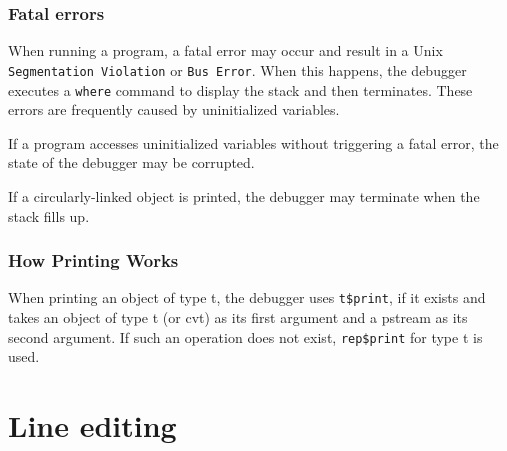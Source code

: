 \subsubsection{Fatal errors}

When running a program, a fatal error may occur and result in a Unix {\tt
Segmentation Violation} or {\tt Bus Error}.  When this happens, the debugger
executes a {\tt where} command to display the stack and then terminates.  These
errors are frequently caused by uninitialized variables.

If a program accesses uninitialized variables without triggering a fatal error,
the state of the debugger may be corrupted.

If a circularly-linked object is printed, the debugger may terminate
when the stack fills up.

\subsubsection{How Printing Works}

When printing an object of type t, the debugger uses {\tt t\$print}, if it
exists and takes an object of type t (or cvt) as its first argument and
a pstream as its second argument.  If such an operation does not exist,
{\tt rep\$print} for type t is used.

\section{Line editing}

